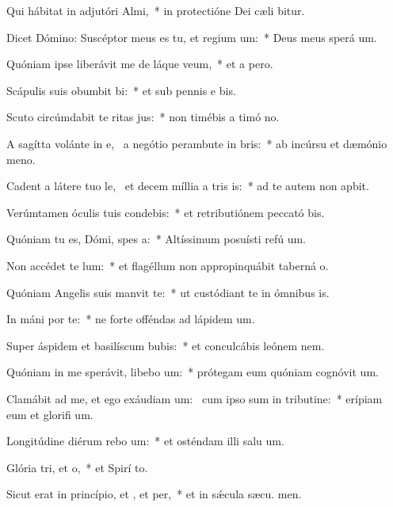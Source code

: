 \item Qui hábitat in adjutóri Almi,~* in protectióne Dei cæli bitur.
\item Dicet Dómino: Suscéptor meus es tu, et regium um:~* Deus meus sperá  um.
\item Quóniam ipse liberávit me de láque veum,~* et a  pero.
\item Scápulis suis obumbit bi:~* et sub pennis e bis.
\item Scuto circúmdabit te ritas jus:~* non timébis a timó no.
\item A sagítta volánte in e,~\pscross{} a negótio perambute in bris:~* ab incúrsu et dæmónio meno.
\item Cadent a látere tuo le,~\pscross{} et decem míllia a tris is:~* ad te autem non apbit.
\item Verúmtamen óculis tuis condebis:~* et retributiónem peccató bis.
\item Quóniam tu es, Dómi, spes a:~* Altíssimum posuísti refú um.
\item Non accédet  te lum:~* et flagéllum non appropinquábit taberná o.
\item Quóniam Angelis suis manvit  te:~* ut custódiant te in ómnibus  is.
\item In máni por te:~* ne forte offéndas ad lápidem  um.
\item Super áspidem et basilíscum bubis:~* et conculcábis leónem  nem.
\item Quóniam in me sperávit, libebo um:~* prótegam eum quóniam cognóvit  um.
\item Clamábit ad me, et ego exáudiam um:~\pscross{} cum ipso sum in tributine:~* erípiam eum et glorifi um.
\item Longitúdine diérum rebo um:~* et osténdam illi salu um.
\item Glória tri, et o,~* et Spirí to.
\item Sicut erat in princípio, et , et per,~* et in sǽcula sæcu. men.
